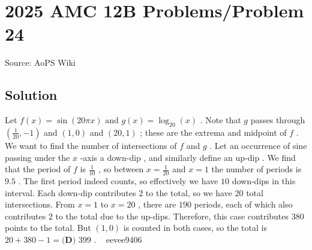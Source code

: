\documentclass[12pt]{article}
\begin{document}
\section*{{2025 AMC 12B Problems/Problem 24}}
Source: AoPS Wiki

\subsection*{Solution}
Let $f(x)=\sin(20\pi x)$ and $g(x)=\log_{20}(x)$ . Note that $g$ passes through $\left(\frac{1}{20},-1\right)$ and $(1,0)$ and $(20,1)$ ; these are the extrema and midpoint of $f$ . We want to find the number of intersections of $f$ and $g$ . Let an occurrence of sine passing under the $x$ -axis a down-dip , and similarly define an up-dip . We find that the period of $f$ is $\frac{1}{10}$ , so between $x=\frac{1}{20}$ and $x=1$ the number of periods is $9.5$ . The first period indeed counts, so effectively we have $10$ down-dips in this interval. Each down-dip contributes $2$ to the total, so we have $20$ total intersections. From $x=1$ to $x=20$ , there are $190$ periods, each of which also contributes $2$ to the total due to the up-dips. Therefore, this case contributes $380$ points to the total. But $(1,0)$ is counted in both cases, so the total is $20+380-1=\boxed{\textbf{(D) } 399}$ . ~ eevee9406
\end{document}
